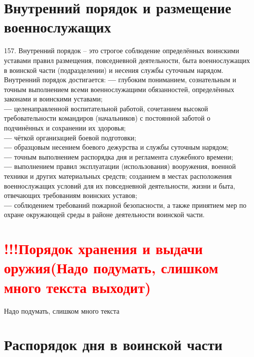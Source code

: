 \documentclass[12pt,a4paper]{report}
\begin{document}
\section{Внутренний порядок  и размещение военнослужащих}
157. Внутренний порядок – это строгое соблюдение определённых воинскими уставами правил размещения, повседневной деятельности, быта военнослужащих в воинской части (подразделении) и несения службы суточным нарядом.\\
Внутренний порядок достигается:
\textbf{---} глубоким пониманием, сознательным и точным выполнением всеми военнослужащими обязанностей, определённых законами и воинскими уставами;\\
\textbf{---} целенаправленной воспитательной работой, сочетанием высокой требовательности командиров (начальников) с постоянной заботой о подчинённых и сохранении их здоровья;\\
\textbf{---} чёткой организацией боевой подготовки;\\
\textbf{--- }образцовым несением боевого дежурства и службы суточным нарядом;\\
\textbf{---} точным выполнением распорядка дня и регламента служебного времени;\\
\textbf{---} выполнением правил эксплуатации (использования) вооружения, военной техники и других материальных средств; созданием в местах расположения военнослужащих условий для их повседневной деятельности, жизни и быта, отвечающих требованиям воинских уставов;\\
\textbf{---} соблюдением требований пожарной безопасности, а также принятием мер по охране окружающей среды в районе деятельности воинской части.\\

\section{\textcolor{red}{!!!Порядок хранения и выдачи оружия(Надо подумать, слишком много текста выходит)}}
Надо подумать, слишком много текста

\section{Распорядок дня в воинской части}
\end{document}
